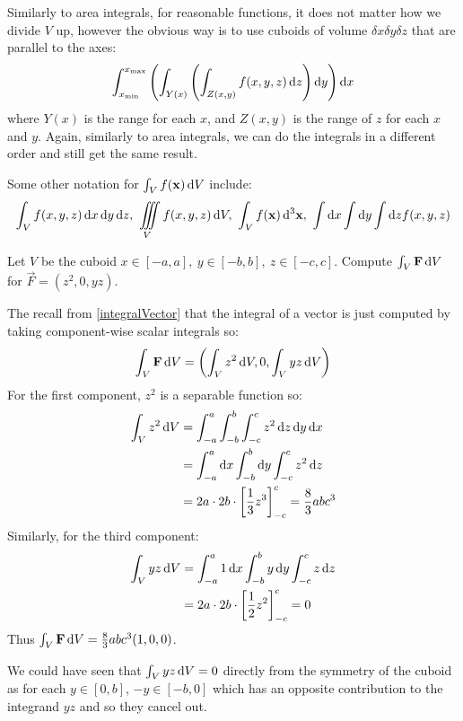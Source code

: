 \documentclass[../main.tex]{subfiles}
\begin{document}
Similarly to area integrals, for reasonable functions, it does not matter how we divide $V$ up, however the obvious way is to use cuboids of volume $\delta x \delta y \delta z$ that are parallel to the axes:
\[
  \int_{x_{\text{min}}}^{x_{\text{max}}} \left(\int_{Y(x)} \left(\int_{Z(x, y)} f(x, y, z) \d{z}\right) \d{y}\right) \d{x}
\]
where $Y(x)$ is the range for each $x$, and $Z(x, y)$ is the range of $z$ for each $x$ and $y$.
Again, similarly to area integrals, we can do the integrals in a different order and still get the same result.
\begin{remark}[Notation]
  Some other notation for $\int_V f(\vec{x}) \d{V}$  include:
  \[
    \int_V f(x, y, z) \d{x} \d{y} \d{z},\ \iiint\limits_V f(x, y, z) \d{V},\ \int_V f(\vec{x}) \d^3{\vec{x}},\ \int\d{x}\int\d{y} \int \d{z} f(x, y, z)
  \]
\end{remark}
\begin{example}
  Let $V$ be the cuboid $x \in [-a, a],\ y \in [-b, b],\ z \in [-c, c]$.
  Compute $\int_{V} \vec{F} \d{V}$ for $\vec{F} = (z^2, 0, yz)$.

  The recall from \cref{integralVector} that the integral of a vector is just computed by taking component-wise scalar integrals so:
  \[
    \int_{V} \vec{F} \d{V} = \left(\int_{V} z^2 \d{V}, 0, \int_{V} yz \d{V}\right)
  \]
  For the first component, $z^2$ is a separable function so:
  \begin{align*}
    \int_{V} z^2 \d{V} &= \int_{-a}^{a} \int_{-b}^{b} \int_{-c}^{c} z^2 \d{z} \d{y} \d{x} \\
                       &= \int_{-a}^{a} \d{x} \int_{-b}^{b} \d{y} \int_{-c}^{c} z^2 \d{z}  \\
                       &= 2a \cdot 2b \cdot \eval{\frac{1}{3}z^3}{-c}{c} = \frac{8}{3}abc^3
  \end{align*}
  Similarly, for the third component:
  \begin{align*}
    \int_{V} yz \d{V} &= \int_{-a}^{a} 1 \d{x} \int_{-b}^{b} y \d{y} \int_{-c}^{c} z \d{z} \\
                      &= 2a \cdot 2b \cdot \eval{\frac{1}{2}z^2}{-c}{c} = 0
  \end{align*}
  Thus $\int_{V} \vec{F} \d{V} = \frac{8}{3}abc^3(1, 0, 0)$.

  We could have seen that $\int_{V} yz \d{V} = 0$ directly from the symmetry of the cuboid as for each $y \in [0, b]$, $-y \in [-b, 0]$ which has an opposite contribution to the integrand $yz$ and so they cancel out.
\end{example}
\end{document}
